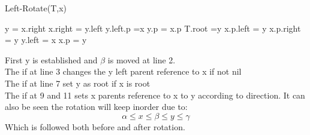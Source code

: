 \documentclass[12pt, a4paper]{article}
\begin{document}
					\begin{minipage}{0.49\textwidth}
						Left-Rotate(T,x)
						\begin{algorithmic}[1]
							\State y = x.right
							\State x.right = y.left
								\State y.left.p =x
							\EndIf
							\State y.p = x.p
								\State T.root =y
								\State x.p.left = y
							\Else 
								\State x.p.right = y
							\EndIf
							\State y.left = x
							\State x.p = y
						\end{algorithmic}
					\end{minipage}
					\begin{minipage}{0.49\textwidth}
						First y is established and $\beta$ is moved at line 2.\\
						The if at line 3 changes the y left parent reference to x if not nil\\
						The if at line 7 set y as root if x is root\\
						The if at 9 and 11 sets x parents reference to x to y according to direction.
						It can also be seen the rotation will keep inorder due to:
						$$\alpha \leq x \leq \beta \leq  y \leq \gamma$$
						Which is followed both before and after rotation.
					\end{minipage}
\end{document}
